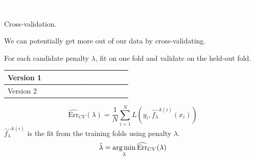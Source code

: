 \documentclass[xcolor={table}, handout]{beamer}
\begin{document}

\begin{transitionframe}
\centering

\LARGE \textcolor{white}{Cross-validation.}

\end{transitionframe}
\begin{frame}{Cross-validation.}

\begin{wideitemize}
\item We can potentially get more out of our data by cross-validating. \pause
\item For each candidate penalty $\lambda$, fit on one fold and validate on the held-out fold.
\end{wideitemize}

\begin{table}[]
\renewcommand{\arraystretch}{2.5}
\begin{tabular}{l >{\centering\arraybackslash}p{4cm}|>{\centering\arraybackslash}p{4cm} }
Version 1 & \cellcolor{Contrast1l} \textcolor{white}{Training} & \cellcolor{Contrast4l} \textcolor{white}{Validation} \\
\hline
Version 2 & \cellcolor{Contrast4l} \textcolor{white}{Validation} & \cellcolor{Contrast1l} \textcolor{white}{Training} \\
\end{tabular}
\end{table}
\pause

\[
\widehat{\textrm{Err}}_{CV}(\lambda) = \frac{1}{N}\sum_{i = 1}^N L\left(y_i, \hat{f}^{-k(i)}_{\lambda}(x_i) \right)
\]
$\hat{f}^{-k(i)}_{\lambda}$ is the fit from the training folds using penalty $\lambda$. \pause
\[
\hat{\lambda} = \operatorname*{{\textrm {arg} }\,\!\min}_{\lambda} \widehat{\textrm{Err}}_{CV}(\lambda)
\]

\end{frame}


\end{document}
